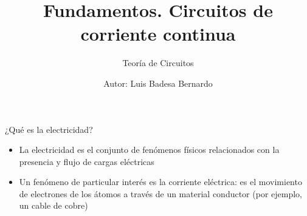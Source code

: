 \documentclass[aspectratio=169, xcolor={usenames,svgnames,dvipsnames}]{beamer}
\author{Autor: \hspace{2mm} Luis Badesa Bernardo}
\date{}
\title{Fundamentos. Circuitos de corriente continua \vspace{3mm}}
\subtitle{Teoría de Circuitos}
\begin{document}
\maketitle


\begin{frame}{¿Qué es la electricidad?}
    \begin{itemize}
        \item La electricidad es el conjunto de fenómenos físicos relacionados con la \alert{presencia y flujo} de \alert{cargas eléctricas}

        \vspace{5mm}
        
        \item Un fenómeno de particular interés es la \alert{corriente eléctrica}: es el movimiento de electrones de los átomos a través de un material conductor (por ejemplo, un cable de cobre) 
    \end{itemize}
\end{frame}

\end{document}
